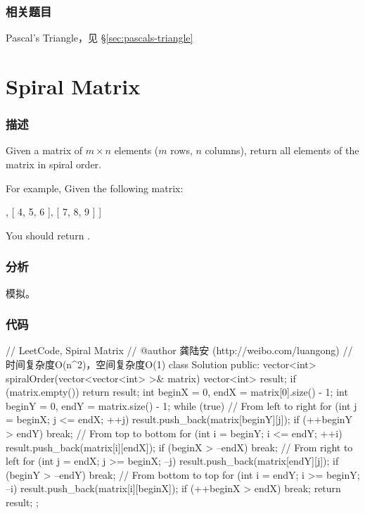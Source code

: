 \subsubsection{相关题目}
\begindot
\item Pascal's Triangle，见 \S \ref{sec:pascals-triangle}
\myenddot


\section{Spiral Matrix} %
\label{sec:spiral-matrix}


\subsubsection{描述}
Given a matrix of $m \times n$ elements ($m$ rows, $n$ columns), return all elements of the matrix in spiral order.

For example,
Given the following matrix:
\begin{Code}
[
 [ 1, 2, 3 ],
 [ 4, 5, 6 ],
 [ 7, 8, 9 ]
]
\end{Code}
You should return \fn{[1,2,3,6,9,8,7,4,5]}.


\subsubsection{分析}
模拟。

\subsubsection{代码}
\begin{Code}
// LeetCode, Spiral Matrix
// @author 龚陆安 (http://weibo.com/luangong)
// 时间复杂度O(n^2)，空间复杂度O(1)
class Solution {
public:
    vector<int> spiralOrder(vector<vector<int> >& matrix) {
        vector<int> result;
        if (matrix.empty()) return result;
        int beginX = 0, endX = matrix[0].size() - 1;
        int beginY = 0, endY = matrix.size() - 1;
        while (true) {
            // From left to right
            for (int j = beginX; j <= endX; ++j) result.push_back(matrix[beginY][j]);
            if (++beginY > endY) break;
            // From top to bottom
            for (int i = beginY; i <= endY; ++i) result.push_back(matrix[i][endX]);
            if (beginX > --endX) break;
            // From right to left
            for (int j = endX; j >= beginX; --j) result.push_back(matrix[endY][j]);
            if (beginY > --endY) break;
            // From bottom to top
            for (int i = endY; i >= beginY; --i) result.push_back(matrix[i][beginX]);
            if (++beginX > endX) break;
        }
        return result;
    }
};
\end{Code}


